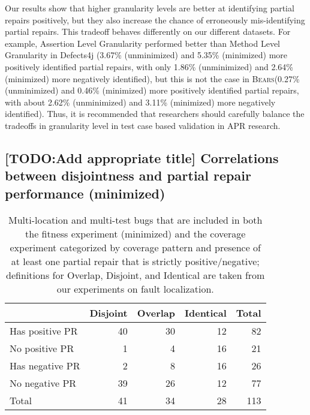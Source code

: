 \documentclass[10pt, conference]{IEEEtran}
\newcommand\bears{\textsc{Bears}\xspace}
\begin{document}
Our results show that higher granularity levels are better at identifying partial repairs positively, 
but they also increase the chance of erroneously mis-identifying partial repairs. 
This tradeoff behaves differently on our different datasets. For example,
Assertion Level Granularity performed better than Method Level Granularity
in Defects4j (3.67\% (unminimized) and 5.35\% (minimized) more positively identified partial repairs, with only 1.86\% (unminimized) and 2.64\% (minimized) more negatively identified), but this is not the case in \bears (0.27\% 
(unminimized) and 0.46\% (minimized)
more positively identified partial repairs, with about 2.62\% (unminimized) and 3.11\% (minimized)
 more negatively identified).
Thus, it is recommended that researchers should 
carefully balance the tradeoffs in granularity level in test case based validation
in APR research.

\subsection{[TODO:Add appropriate title] Correlations between disjointness and partial repair performance (minimized)}

\begin{table}
        {\begin{center}
                        \begin{tabular} {lrrrr}
                                \toprule
                                & Disjoint & Overlap & Identical & Total \\
                                \midrule
                                Has positive PR & 40 & 30 & 12 & 82 \\
                                No positive PR & 1 & 4 & 16 &  21 \\
                \midrule
                                Has negative PR & 2 & 8 & 16 & 26 \\
                                No negative PR & 39 & 26 & 12 & 77 \\
                \midrule
                                Total & 41 & 34 & 28 & 113 \\
                \bottomrule
                        \end{tabular}
                \end{center}
        }
        \caption{Multi-location and multi-test bugs that are included in both the fitness experiment (minimized) and the coverage experiment categorized by coverage pattern and presence of at least one partial repair that is strictly positive/negative; definitions for Overlap, Disjoint, and Identical are taken from our experiments on fault localization.}
        \label{tab:cov_fitness}
\end{table}
\end{document}

